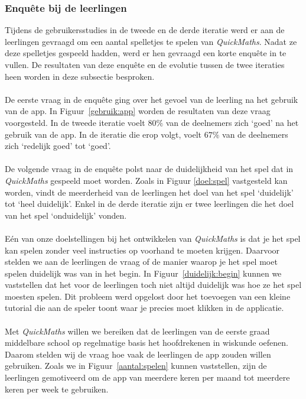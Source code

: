 \documentclass[11pt]{article}
\begin{document}
		\subsubsection{Enqu\^ete bij de leerlingen}
Tijdens de gebruikersstudies in de tweede en de derde iteratie werd er aan de leerlingen gevraagd om een aantal spelletjes te spelen van \textit{QuickMaths}. Nadat ze deze spelletjes gespeeld hadden, werd er hen gevraagd een korte enqu\^ete in te vullen. De resultaten van deze enqu\^ete en de evolutie tussen de twee iteraties heen worden in deze subsectie besproken.\\\\
De eerste vraag in de enqu\^ete ging over het gevoel van de leerling na het gebruik van de app. In Figuur~\ref{gebruik:app} worden de resultaten van deze vraag voorgesteld. In de tweede iteratie voelt $80\%$ van de deelnemers zich `goed' na het gebruik van de app. In de iteratie die erop volgt, voelt $67\%$ van de deelnemers zich `redelijk goed' tot `goed'.\\\\
De volgende vraag in de enqu\^ete polst naar de duidelijkheid van het spel dat in \textit{QuickMaths} gespeeld moet worden. Zoals in Figuur \ref{doel:spel} vastgesteld kan worden, vindt de meerderheid van de leerlingen het doel van het spel `duidelijk' tot `heel duidelijk'. Enkel in de derde iteratie zijn er twee leerlingen die het doel van het spel `onduidelijk' vonden.\\\\
E\'en van onze doelstellingen bij het ontwikkelen van \textit{QuickMaths} is dat je het spel kan spelen zonder veel instructies op voorhand te moeten krijgen. Daarvoor stelden we aan de leerlingen de vraag of de manier waarop je het spel moet spelen duidelijk was van in het begin. In Figuur~\ref{duidelijk:begin} kunnen we vaststellen dat het voor de leerlingen toch niet altijd duidelijk was hoe ze het spel moesten spelen. Dit probleem werd opgelost door het toevoegen van een kleine tutorial die aan de speler toont waar je precies moet klikken in de applicatie.\\\\
Met \textit{QuickMaths} willen we bereiken dat de leerlingen van de eerste graad middelbare school op regelmatige basis het hoofdrekenen in wiskunde oefenen. Daarom stelden wij de vraag hoe vaak de leerlingen de app zouden willen gebruiken. Zoals we in Figuur~\ref{aantal:spelen} kunnen vaststellen, zijn de leerlingen gemotiveerd om de app van meerdere keren per maand tot meerdere keren per week te gebruiken.\\\\
\end{document}
